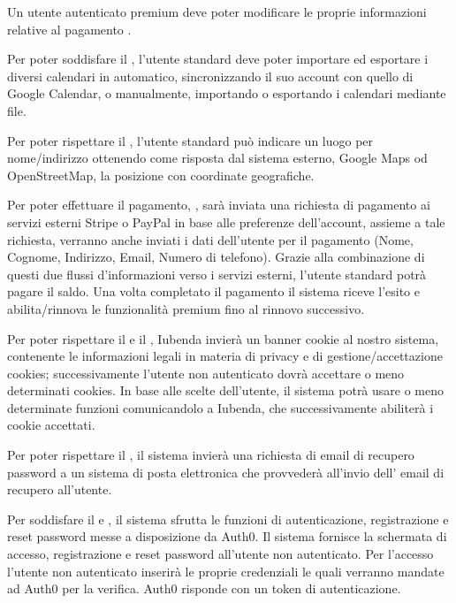 \begin{listaPersonale}[DC]{}
    Un utente autenticato premium deve poter modificare le proprie informazioni relative al pagamento .

    Per poter soddisfare il , l'utente standard deve poter importare ed esportare i diversi calendari in automatico, sincronizzando il suo account con quello di Google Calendar, o manualmente, importando o esportando i calendari mediante file.

    Per poter rispettare il , l'utente standard può indicare un luogo per nome/indirizzo ottenendo come risposta dal sistema esterno, Google Maps od OpenStreetMap, la posizione con coordinate geografiche.

    Per poter effettuare il pagamento, , sarà inviata una richiesta di pagamento ai servizi esterni Stripe o PayPal in base alle preferenze dell'account, assieme a tale richiesta, verranno anche inviati i dati dell'utente per il pagamento (Nome, Cognome, Indirizzo, Email, Numero di telefono). Grazie alla combinazione di questi due flussi d'informazioni verso i servizi esterni, l'utente standard potrà pagare il saldo. Una volta completato il pagamento il sistema riceve l'esito e abilita/rinnova le funzionalità premium fino al rinnovo successivo.

    Per poter rispettare il  e il , Iubenda invierà un banner cookie al nostro sistema, contenente le informazioni legali in materia di privacy e di gestione/accettazione cookies; successivamente l'utente non autenticato dovrà accettare o meno determinati cookies. In base alle scelte dell'utente, il sistema potrà usare o meno determinate funzioni comunicandolo a Iubenda, che successivamente abiliterà i cookie accettati.

    Per poter rispettare il , il sistema invierà una richiesta di email di recupero password a un sistema di posta elettronica che provvederà all'invio dell' email di recupero all'utente. %

    Per soddisfare il  e , il sistema sfrutta le funzioni di autenticazione, registrazione e reset password messe a disposizione da Auth0. Il sistema fornisce la schermata di accesso, registrazione e reset password all'utente non autenticato. Per l'accesso l'utente non autenticato inserirà le proprie credenziali le quali verranno mandate ad Auth0 per la verifica. Auth0 risponde con un token di autenticazione.


\end{listaPersonale}

